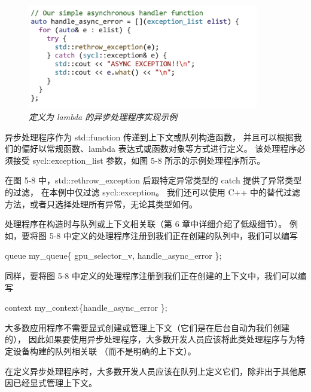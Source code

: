\begin{figure}[H]
	\centering
	\includegraphics[width=0.9\textwidth]{figs/F5.8.png}
	\caption{\textit{定义为 lambda 的异步处理程序实现示例}}
\end{figure}

异步处理程序作为 std::function 传递到上下文或队列构造函数，
并且可以根据我们的偏好以常规函数、lambda 表达式或函数对象等方式进行定义。 
该处理程序必须接受 sycl::exception\_list 参数，如图 5-8 所示的示例处理程序所示。

在图 5-8 中，std::rethrow\_exception 后跟特定异常类型的 catch 提供了异常类型的过滤，
在本例中仅过滤 sycl::exception。 我们还可以使用 C++ 中的替代过滤方法，或者只选择处理所有异常，无论其类型如何。

处理程序在构造时与队列或上下文相关联（第 6 章中详细介绍了低级细节）。 
例如，要将图 5-8 中定义的处理程序注册到我们正在创建的队列中，我们可以编写

queue my\_queue\{ gpu\_selector\_v, handle\_async\_error \};

同样，要将图 5-8 中定义的处理程序注册到我们正在创建的上下文中，我们可以编写

context my\_context\{handle\_async\_error \};

大多数应用程序不需要显式创建或管理上下文（它们是在后台自动为我们创建的），
因此如果要使用异步处理程序，大多数开发人员应该将此类处理程序与为特定设备构建的队列相关联 （而不是明确的上下文）。

\begin{remark}
	在定义异步处理程序时，大多数开发人员应该在队列上定义它们，除非出于其他原因已经显式管理上下文。
\end{remark}

